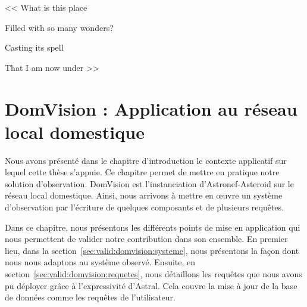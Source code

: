 \begin{savequote}[6cm]
<< What is this place

Filled with so many wonders?

Casting its spell

That I am now under >>

\end{savequote}

\chapter{DomVision : Application au réseau local domestique}\label{chap:valid:domvision}
\chaptertoc
Nous avons présenté dans le chapitre d'introduction le contexte applicatif sur lequel cette thèse s'appuie. Ce chapitre permet de mettre en pratique notre solution d'observation. DomVision est l'instanciation d'Astronef-Asteroid sur le réseau local domestique. Ainsi, nous arrivons à mettre en œuvre un système d'observation par l'écriture de quelques composants et de plusieurs requêtes.

Dans ce chapitre, nous présentons les différents points de mise en application qui nous permettent de valider notre contribution dans son ensemble. En premier lieu, dans la section~\ref{sec:valid:domvision:systeme}, nous présentons la façon dont nous nous adaptons au système observé. Ensuite, en section~\ref{sec:valid:domvision:requetes}, nous détaillons les requêtes que nous avons pu déployer grâce à l'expressivité d'Astral. Cela couvre la mise à jour de la base de données comme les requêtes de l'utilisateur.





